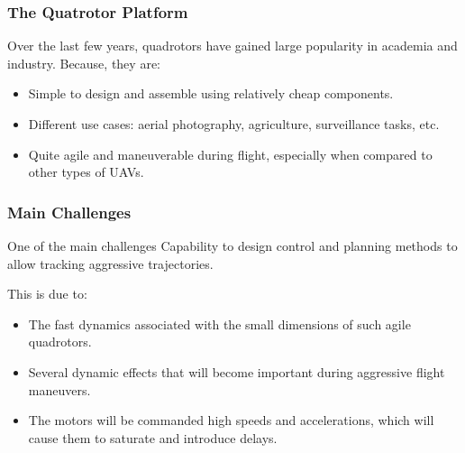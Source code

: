 \documentclass{thesisbeamer}
\newcommand\Fontvi{\fontsize{9}{10}\selectfont}
\begin{document}
\begin{frame}
\frametitle{The Quatrotor Platform}
\Fontvi

Over the last few years, quadrotors have gained large popularity in academia and industry. Because, they are:

\begin{itemize}
	\item Simple to design and assemble using relatively cheap components.
	\item Different use cases: aerial photography, agriculture, surveillance tasks, etc.
	\item Quite agile and maneuverable during flight, especially when compared to other types of UAVs.
\end{itemize}

\end{frame}

\begin{frame}
\frametitle{Main Challenges}

\begin{block}{One of the main challenges}
	Capability to design control and planning methods to allow tracking aggressive trajectories.
\end{block}

This is due to: 
\begin{itemize}
	\item The fast dynamics associated with the small dimensions of such agile quadrotors.
	\item Several dynamic effects that will become important during aggressive flight maneuvers.
	\item The motors will be commanded high speeds and accelerations, which will cause them to saturate and introduce delays.
\end{itemize}


\end{frame}
\end{document}
